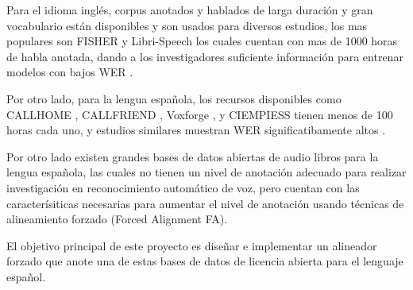 Para el idioma inglés, corpus anotados y hablados de larga duración y gran vocabulario están disponibles y son usados para diversos estudios, los mas populares son FISHER \cite{CieriTheSpeech-to-Text} y Libri-Speech  \cite{PanayotovLIBRISPEECH:BOOKS}  los cuales cuentan con mas de 1000 horas de habla anotada, dando a los investigadores suficiente información para entrenar modelos con bajos WER \cite{HannunDeepRecognition}.

Por otro lado, para la lengua española, los recursos disponibles como CALLHOME \cite{CALLHOMESpa}, CALLFRIEND  \cite{CALLFRIENDSpa}, Voxforge \cite{Voxforge.org}, y CIEMPIESS \cite{Hernandez-MenaCIEMPIESS:Corpus} tienen menos de 100 horas cada uno, y estudios similares muestran WER significatibamente altos \cite{Hernandez-Mena2017AutomaticResources}.

Por otro lado existen grandes bases de datos abiertas de audio libros para la lengua española, las cuales no tienen un nivel de anotación adecuado para realizar investigación en reconocimiento automático de voz, pero cuentan con las caracterísiticas necesarias para aumentar el nivel de anotación usando técnicas de alineamiento forzado (Forced Alignment FA). 

El objetivo principal de este proyecto es diseñar e implementar un alineador forzado que anote una de estas bases de datos de licencia abierta para el lenguaje español.

